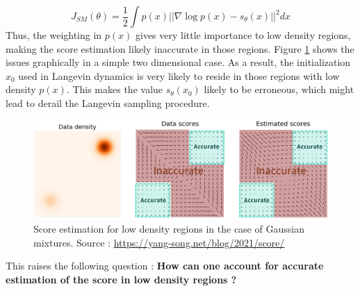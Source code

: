 \begin{equation}\label{eq:unfolded_score_matching}
    J_{SM}(\theta) =\frac{1}{2} \int p(x)||\nabla \log p(x) - s_{\theta}(x)||^{2} dx
\end{equation}
Thus, the weighting in $p(x)$ gives very little importance to low density regions, making the score estimation likely inaccurate in those regions.
Figure \ref{fig:low_d_estimation} shows the issues graphically in a simple two dimensional case. As a result, the initialization $x_{0}$ used in Langevin dynamics is very likely to reside in those regions with low density $p(x)$. This makes the value $s_{\theta}(x_{0})$ likely to be erroneous, which might lead to derail the Langevin sampling procedure. 
\begin{figure}[h]
    \centering
    \includegraphics[width=0.8\linewidth]{gfx/low_density_probs.png}
    \caption{Score estimation for low density regions in the case of Gaussian mixtures. Source : \url{https://yang-song.net/blog/2021/score/}}
    \label{fig:low_d_estimation}
\end{figure}
This raises the following question : \textbf{How can one account for accurate estimation of the score in low density regions ?}
